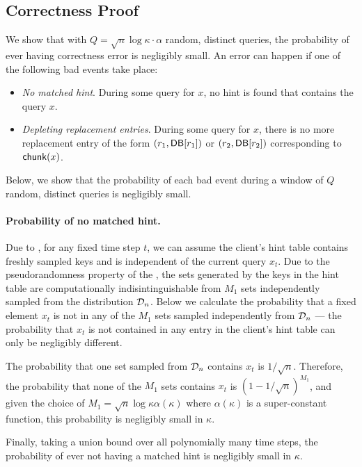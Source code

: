 \subsection{Correctness Proof}
\label{sec:2server-correct}

We show that with $Q = \sqrt{n} \log \kappa \cdot \alpha$ 
random, distinct queries,
the probability of ever having correctness error is negligibly small. 
An error can happen 
if one of the following bad events take place:
\begin{itemize}[leftmargin=5mm]
\item 
{\it No matched hint}. 
During some query for $x$, 
no hint is found that contains the query $x$.
\item 
{\it Depleting replacement entries}. 
During some query for $x$, there is no more replacement
entry of the form $(r_1, \mathsf{DB}[r_1])$ 
or $(r_2, \mathsf{DB}[r_2])$ 
corresponding to $\mathsf{chunk}(x)$. 
\end{itemize}

Below, we show 
that the probability of each bad event during a window
of $Q$ random, distinct queries 
is negligibly small. 

\paragraph{Probability of no matched hint.}
Due to , for any fixed time step $t$, 
we can assume the client's hint table
contains freshly sampled \ppps keys and is independent of 
the current query $x_t$.
Due to the pseudorandomness property of the \ppps,
the sets generated by the keys 
in the hint table are computationally indisintinguishable
from 
$M_1$ sets independently sampled from the distribution $\mathcal{D}_n$.
Below we 
calculate the probability that a fixed  
element $x_t$ is not in any of the $M_1$ sets 
sampled independently from 
$\mathcal{D}_n$ --- the probability that $x_t$ is not contained in any entry in the
client's hint table can only be negligibly different.

The probability that one set 
sampled from $\mathcal{D}_n$ contains $x_t$ is $1/\sqrt{n}$. 
Therefore, the probability that 
none of the $M_1$ sets contains $x_t$ is
$(1-1/\sqrt{n})^{M_1}$, and given the choice
of $M_1 = \sqrt{n} \log \kappa \alpha(\kappa)$ where $\alpha(\kappa)$
is a super-constant function,
this probability is negligibly small in $\kappa$.

Finally, taking a union bound over all polynomially many time steps,
the probability of ever not having a matched hint
is negligibly small in $\kappa$. 


